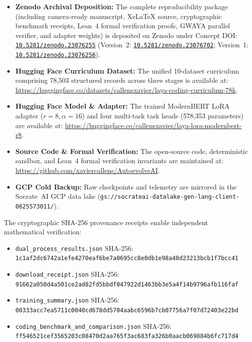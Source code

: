 \documentclass[conference]{IEEEtran}
\begin{document}
\begin{itemize}
  \item \textbf{Zenodo Archival Deposition:} The complete reproducibility package (including camera-ready manuscript, XeLaTeX source, cryptographic benchmark receipts, Lean~4 formal verification proofs, GWAYA parallel verifier, and adapter weights) is deposited on Zenodo under Concept DOI: \href{https://doi.org/10.5281/zenodo.23076255}{\texttt{10.5281/zenodo.23076255}} (Version~2: \href{https://doi.org/10.5281/zenodo.23076702}{\texttt{10.5281/zenodo.23076702}}; Version~1: \href{https://doi.org/10.5281/zenodo.23076256}{\texttt{10.5281/zenodo.23076256}}).
  \item \textbf{Hugging Face Curriculum Dataset:} The unified 10-dataset curriculum comprising 78{,}503 structured records across three stages is available at: \url{https://huggingface.co/datasets/callensxavier/laya-coding-curriculum-78k}.
  \item \textbf{Hugging Face Model \& Adapter:} The trained ModernBERT LoRA adapter ($r=8, \alpha=16$) and four multi-task task heads (578{,}353 parameters) are available at: \url{https://huggingface.co/callensxavier/laya-lora-modernbert-r8}.
  \item \textbf{Source Code \& Formal Verification:} The open-source code, deterministic sandbox, and Lean~4 formal verification invariants are maintained at: \url{https://github.com/xaviercallens/AutoevolveAI}.
  \item \textbf{GCP Cold Backup:} Raw checkpoints and telemetry are mirrored in the Socrate~AI GCP data lake (\texttt{gs://socrateai-datalake-gen-lang-client-0625573011/}).
\end{itemize}

The cryptographic SHA-256 provenance receipts enable independent mathematical verification:
\begin{itemize}
  \item \texttt{dual\_process\_results.json} SHA-256: \texttt{1c1af2dc6742a1efe4270eaf6be7a0695cc8e0db1e98a48d23213bcb1f7bcc41}
  \item \texttt{download\_receipt.json} SHA-256: \texttt{91662a050d4a501ce2ad82fd5bbdf047922d1463bb3e5a4f14b9796afb116faf}
  \item \texttt{training\_summary.json} SHA-256: \texttt{00333acc7ea5711c0040cd678dd5704aabc6596b7cb07756a7f07d72403e22bd}
  \item \texttt{coding\_benchmark\_and\_comparison.json} SHA-256: \texttt{ff546521cef3565203c08470d2aa765f3ac683fa326b0aacb069884b6fc717d4}
\end{itemize}
\end{document}
